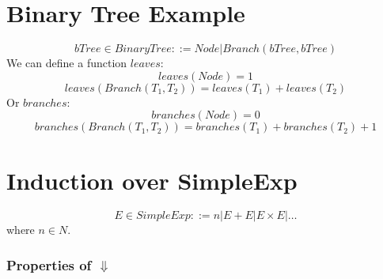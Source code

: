 \documentclass{report}
\begin{document}
\section*{Binary Tree Example}
\[bTree \in BinaryTree ::= Node | Branch(bTree, bTree)\]
We can define a function $leaves$:
\[leaves(Node) = 1\]
\[leaves(Branch(T_1, T_2)) = leaves(T_1) + leaves(T_2)\]
Or $branches$:
\[branches(Node) = 0\]
\[branches(Branch(T_1,T_2)) = branches(T_1) + branches(T_2) + 1\]
\section*{Induction over SimpleExp}
\[E \in SimpleExp ::= n | E + E | E \times E | \dots\]
where $n \in N$.
\subsubsection*{Properties of $\Downarrow$}
\begin{itemize}
\end{itemize}
\end{document}
